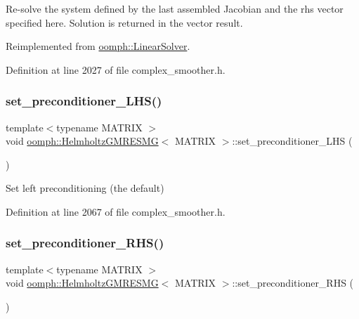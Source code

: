 Re-\/solve the system defined by the last assembled Jacobian and the rhs vector specified here. Solution is returned in the vector result. 



Reimplemented from \hyperlink{classoomph_1_1LinearSolver_a3b310d08333033edc119b2a5bd7dcbfb}{oomph\+::\+Linear\+Solver}.



Definition at line 2027 of file complex\+\_\+smoother.\+h.

\mbox{\label{classoomph_1_1HelmholtzGMRESMG_a86f6bd77359a37117aeb17798b886a81}} 
\subsubsection{\texorpdfstring{set\+\_\+preconditioner\+\_\+\+L\+H\+S()}{set\_preconditioner\_LHS()}}
{\footnotesize\ttfamily template$<$typename M\+A\+T\+R\+IX $>$ \\
void \hyperlink{classoomph_1_1HelmholtzGMRESMG}{oomph\+::\+Helmholtz\+G\+M\+R\+E\+S\+MG}$<$ M\+A\+T\+R\+IX $>$\+::set\+\_\+preconditioner\+\_\+\+L\+HS (\begin{DoxyParamCaption}{ }\end{DoxyParamCaption})\hspace{0.3cm}{\ttfamily [inline]}}



Set left preconditioning (the default) 



Definition at line 2067 of file complex\+\_\+smoother.\+h.

\mbox{\label{classoomph_1_1HelmholtzGMRESMG_ab10551b0e67b40ad91555b1e612208a2}} 
\subsubsection{\texorpdfstring{set\+\_\+preconditioner\+\_\+\+R\+H\+S()}{set\_preconditioner\_RHS()}}
{\footnotesize\ttfamily template$<$typename M\+A\+T\+R\+IX $>$ \\
void \hyperlink{classoomph_1_1HelmholtzGMRESMG}{oomph\+::\+Helmholtz\+G\+M\+R\+E\+S\+MG}$<$ M\+A\+T\+R\+IX $>$\+::set\+\_\+preconditioner\+\_\+\+R\+HS (\begin{DoxyParamCaption}{ }\end{DoxyParamCaption})\hspace{0.3cm}{\ttfamily [inline]}}



